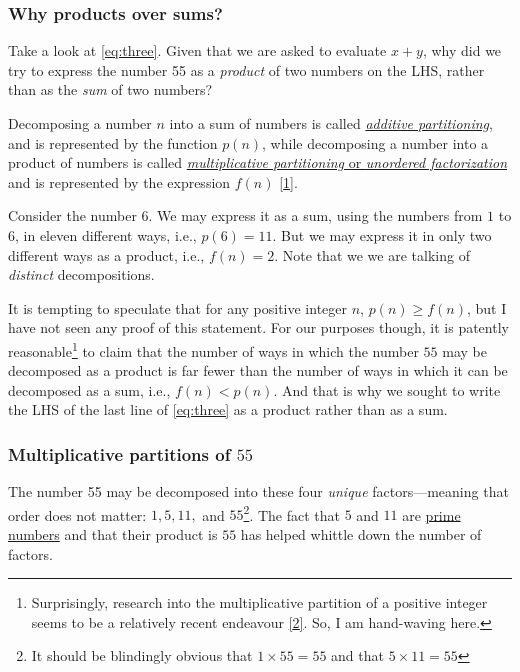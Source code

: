 \documentclass[
  a4paper,
]{article}
\begin{document}
\hypertarget{why-products-over-sums}{%
\subsubsection{Why products over sums?}\label{why-products-over-sums}}

Take a look at \cref{eq:three}. Given that we are asked to evaluate
\(x + y\), why did we try to express the number 55 as a \emph{product}
of two numbers on the LHS, rather than as the \emph{sum} of two numbers?

Decomposing a number \(n\) into a sum of numbers is called
\href{https://mathworld.wolfram.com/Partition.html}{\emph{additive
partitioning}}, and is represented by the function \(p(n)\), while
decomposing a number into a product of numbers is called
\href{https://mathworld.wolfram.com/UnorderedFactorization.html}{\emph{multiplicative
partitioning} or \emph{unordered factorization}} and is represented by
the expression \(f(n)\) \protect\hyperlink{ref-brown-2017}{{[}1{]}}.

Consider the number \(6\). We may express it as a sum, using the numbers
from \(1\) to \(6\), in eleven different ways, i.e., \(p(6) = 11\). But
we may express it in only two different ways as a product, i.e.,
\(f(n)=2\). Note that we we are talking of \emph{distinct}
decompositions.

It is tempting to speculate that for any positive integer \(n\),
\(p(n) \geq f(n)\), but I have not seen any proof of this statement. For
our purposes though, it is patently reasonable\footnote{Surprisingly,
  research into the multiplicative partition of a positive integer seems
  to be a relatively recent endeavour
  \protect\hyperlink{ref-dodd-1987}{{[}2{]}}. So, I am hand-waving here.}
to claim that the number of ways in which the number \(55\) may be
decomposed as a product is far fewer than the number of ways in which it
can be decomposed as a sum, i.e., \(f(n) < p(n)\). And that is why we
sought to write the LHS of the last line of \cref{eq:three} as a product
rather than as a sum.

\hypertarget{multiplicative-partitions-of-55}{%
\subsubsection{\texorpdfstring{Multiplicative partitions of
\(55\)}{Multiplicative partitions of 55}}\label{multiplicative-partitions-of-55}}

The number 55 may be decomposed into these four \emph{unique}
factors---meaning that order does not matter: \(1, 5, 11,\) and
\(55\)\footnote{It should be blindingly obvious that
  \(1 \times 55 = 55\) and that \(5 \times 11 = 55\)
  \normalfont}. The fact that \(5\) and \(11\) are
\href{https://mathworld.wolfram.com/PrimeFactor.html}{prime numbers} and
that their product is \(55\) has helped whittle down the number of
factors.
\end{document}
